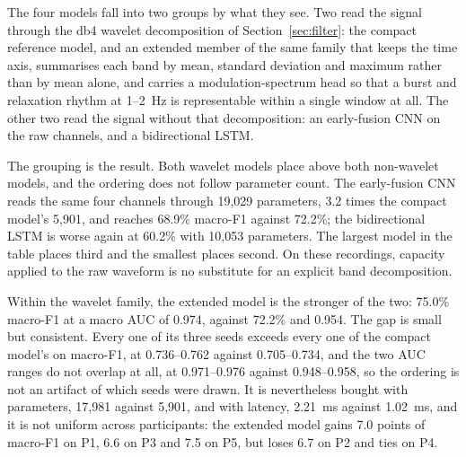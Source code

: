 \documentclass[pdflatex,sn-nature,iicol]{sn-jnl}
\begin{document}
The four models fall into two groups by what they see. Two read the signal through the db4 wavelet decomposition of Section~\ref{sec:filter}: the compact reference model, and an extended member of the same family that keeps the time axis, summarises each band by mean, standard deviation and maximum rather than by mean alone, and carries a modulation-spectrum head so that a burst and relaxation rhythm at 1--2~Hz is representable within a single window at all. The other two read the signal without that decomposition: an early-fusion CNN on the raw channels, and a bidirectional LSTM.

The grouping is the result. Both wavelet models place above both non-wavelet models, and the ordering does not follow parameter count. The early-fusion CNN reads the same four channels through 19,029 parameters, 3.2 times the compact model's 5,901, and reaches 68.9\% macro-F1 against 72.2\%; the bidirectional LSTM is worse again at 60.2\% with 10,053 parameters. The largest model in the table places third and the smallest places second. On these recordings, capacity applied to the raw waveform is no substitute for an explicit band decomposition.

Within the wavelet family, the extended model is the stronger of the two: 75.0\% macro-F1 at a macro AUC of 0.974, against 72.2\% and 0.954. The gap is small but consistent. Every one of its three seeds exceeds every one of the compact model's on macro-F1, at 0.736--0.762 against 0.705--0.734, and the two AUC ranges do not overlap at all, at 0.971--0.976 against 0.948--0.958, so the ordering is not an artifact of which seeds were drawn. It is nevertheless bought with parameters, 17,981 against 5,901, and with latency, 2.21~ms against 1.02~ms, and it is not uniform across participants: the extended model gains 7.0 points of macro-F1 on P1, 6.6 on P3 and 7.5 on P5, but loses 6.7 on P2 and ties on P4.
\end{document}
